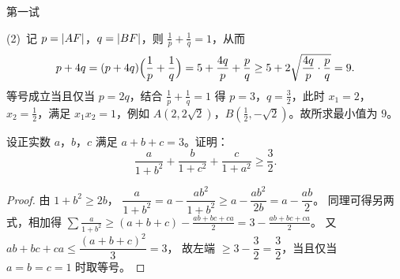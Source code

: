 \documentclass{mojing-exam}
\begin{document}
\begin{paper}[time={8:00—9:20}, full=120]{第一试}
\begin{questions}
\begin{solution}
(2)~记 $p=\lvert AF\rvert$，$q=\lvert BF\rvert$，则 $\frac1p+\frac1q=1$，从而
\[
  p+4q=(p+4q)\Bigl(\frac1p+\frac1q\Bigr)=5+\frac{4q}{p}+\frac{p}{q}\ge5+2\sqrt{\frac{4q}{p}\cdot\frac{p}{q}}=9 .
\]
等号成立当且仅当 $p=2q$，结合 $\frac1p+\frac1q=1$ 得 $p=3$，$q=\frac32$，此时 $x_1=2$，
$x_2=\frac12$，满足 $x_1x_2=1$，例如 $A(2,2\sqrt2)$，$B(\frac12,-\sqrt2)$。故所求最小值为 $9$。
\end{solution}

\question[18] 设正实数 $a$，$b$，$c$ 满足 $a+b+c=3$。证明：
\[
  \frac{a}{1+b^2}+\frac{b}{1+c^2}+\frac{c}{1+a^2}\ge\frac32 .
\]
\answerspace{6cm}
\begin{proof}
由 $1+b^2\ge2b$，
$\dfrac{a}{1+b^2}=a-\dfrac{ab^2}{1+b^2}\ge a-\dfrac{ab^2}{2b}=a-\dfrac{ab}{2}$。
同理可得另两式，相加得
$\displaystyle\sum\frac{a}{1+b^2}\ge(a+b+c)-\frac{ab+bc+ca}{2}=3-\frac{ab+bc+ca}{2}$。
又 $ab+bc+ca\le\dfrac{(a+b+c)^2}{3}=3$，
故左端 $\ge3-\dfrac32=\dfrac32$，当且仅当 $a=b=c=1$ 时取等号。
\end{proof}
\end{questions}

\end{paper}
\end{document}
